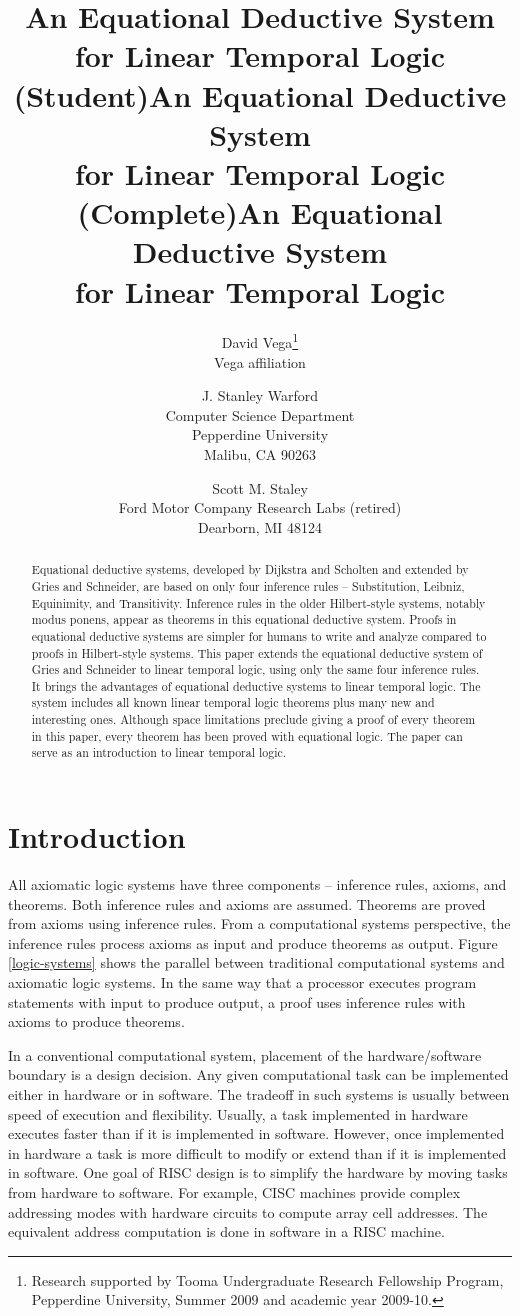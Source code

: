 \documentclass[12pt, fleqn, leqno]{article}
\title{An Equational Deductive System\\for Linear Temporal Logic (Student)}
\title{An Equational Deductive System\\for Linear Temporal Logic (Complete)}
\title{An Equational Deductive System\\for Linear Temporal Logic}
\author{David Vega\thanks{Research supported by Tooma Undergraduate Research Fellowship Program, Pepperdine University, Summer 2009 and academic year 2009-10.}\\
   Vega affiliation
   \and
   J. Stanley Warford\\
   Computer Science Department\\
   Pepperdine University\\
   Malibu, CA 90263
   \and
   Scott M. Staley\\
   Ford Motor Company Research Labs (retired)\\
   Dearborn, MI 48124}
\date{} %
\begin{document}
\maketitle
\begin{abstract}
Equational deductive systems, developed by Dijkstra and Scholten and extended by Gries and Schneider, are based on only four inference rules -- Substitution, Leibniz, Equinimity, and Transitivity.
Inference rules in the older Hilbert-style systems, notably modus ponens, appear as theorems in this equational deductive system.
Proofs in equational deductive systems are simpler for humans to write and analyze compared to proofs in Hilbert-style systems.
This paper extends the equational deductive system of Gries and Schneider to linear temporal logic, using only the same four inference rules.
It brings the advantages of equational deductive systems to linear temporal logic.
The system includes all known linear temporal logic theorems plus many new and interesting ones.
Although space limitations preclude giving a proof of every theorem in this paper, every theorem has been proved with equational logic.
The paper can serve as an introduction to linear temporal logic.
\end{abstract}

\thispagestyle{plain}

\section{Introduction}

All axiomatic logic systems have three components -- inference rules, axioms, and theorems.
Both inference rules and axioms are assumed.
Theorems are proved from axioms using inference rules.
From a computational systems perspective, the inference rules process axioms as input and produce theorems as output.
Figure \ref{logic-systems} shows the parallel between traditional computational systems and axiomatic logic systems.
In the same way that a processor executes program statements with input to produce output, a proof uses inference rules with axioms to produce theorems.

In a conventional computational system, placement of the hardware/software boundary is a design decision.
Any given computational task can be implemented either in hardware or in software.
The tradeoff in such systems is usually between speed of execution and flexibility.
Usually, a task implemented in hardware executes faster than if it is implemented in software.
However, once implemented in hardware a task is more difficult to modify or extend than if it is implemented in software.
One goal of RISC design is to simplify the hardware by moving tasks from hardware to software.
For example, CISC machines provide complex addressing modes with hardware circuits to compute array cell addresses.
The equivalent address computation is done in software in a RISC machine.
\end{document}

